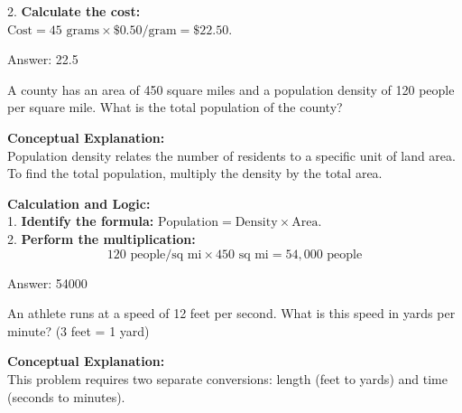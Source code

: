 \documentclass[11pt,paper=a4,answers]{exam}
\begin{document}
\begin{questions}
\begin{solution}
\vspace{15pt}

2. \textbf{Calculate the cost:} \\
$\text{Cost} = 45 \text{ grams} \times \$0.50/\text{gram} = \$22.50$.

\vspace{30pt}

Answer: \colorbox{yellow!100}{22.5}
\end{solution}

\vspace{60pt}

\question
A county has an area of 450 square miles and a population density of 120 people per square mile. What is the total population of the county?

\begin{solution}
\textbf{Conceptual Explanation:} \\
Population density relates the number of residents to a specific unit of land area. To find the total population, multiply the density by the total area.

\vspace{30pt}

\textbf{Calculation and Logic:} \\
1. \textbf{Identify the formula:} $\text{Population} = \text{Density} \times \text{Area}$. \\
2. \textbf{Perform the multiplication:} \\
\[ 120 \text{ people/sq mi} \times 450 \text{ sq mi} = 54,000 \text{ people} \]

\vspace{30pt}

Answer: \colorbox{yellow!100}{54000}
\end{solution}

\vspace{60pt}

\question
An athlete runs at a speed of 12 feet per second. What is this speed in yards per minute? (3 feet = 1 yard)

\begin{solution}
\textbf{Conceptual Explanation:} \\
This problem requires two separate conversions: length (feet to yards) and time (seconds to minutes).

\vspace{30pt}


\end{solution}
\end{questions}
\end{document}
